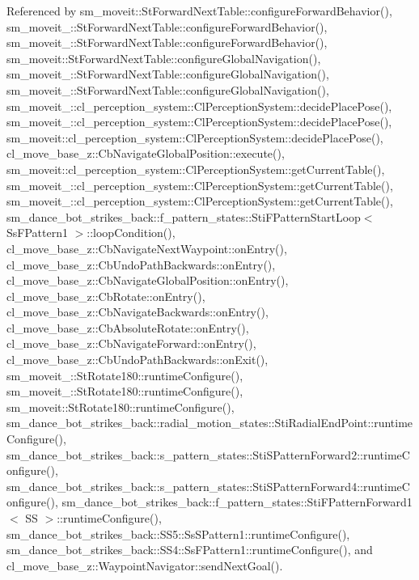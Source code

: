 Referenced by sm\+\_\+moveit\+::\+St\+Forward\+Next\+Table\+::configure\+Forward\+Behavior(), sm\+\_\+moveit\+\_\+::\+St\+Forward\+Next\+Table\+::configure\+Forward\+Behavior(), sm\+\_\+moveit\+\_\+::\+St\+Forward\+Next\+Table\+::configure\+Forward\+Behavior(), sm\+\_\+moveit\+::\+St\+Forward\+Next\+Table\+::configure\+Global\+Navigation(), sm\+\_\+moveit\+\_\+::\+St\+Forward\+Next\+Table\+::configure\+Global\+Navigation(), sm\+\_\+moveit\+\_\+::\+St\+Forward\+Next\+Table\+::configure\+Global\+Navigation(), sm\+\_\+moveit\+\_\+::cl\+\_\+perception\+\_\+system\+::\+Cl\+Perception\+System\+::decide\+Place\+Pose(), sm\+\_\+moveit\+\_\+::cl\+\_\+perception\+\_\+system\+::\+Cl\+Perception\+System\+::decide\+Place\+Pose(), sm\+\_\+moveit\+::cl\+\_\+perception\+\_\+system\+::\+Cl\+Perception\+System\+::decide\+Place\+Pose(), cl\+\_\+move\+\_\+base\+\_\+z\+::\+Cb\+Navigate\+Global\+Position\+::execute(), sm\+\_\+moveit\+::cl\+\_\+perception\+\_\+system\+::\+Cl\+Perception\+System\+::get\+Current\+Table(), sm\+\_\+moveit\+\_\+::cl\+\_\+perception\+\_\+system\+::\+Cl\+Perception\+System\+::get\+Current\+Table(), sm\+\_\+moveit\+\_\+::cl\+\_\+perception\+\_\+system\+::\+Cl\+Perception\+System\+::get\+Current\+Table(), sm\+\_\+dance\+\_\+bot\+\_\+strikes\+\_\+back\+::f\+\_\+pattern\+\_\+states\+::\+Sti\+F\+Pattern\+Start\+Loop$<$ Ss\+F\+Pattern1 $>$\+::loop\+Condition(), cl\+\_\+move\+\_\+base\+\_\+z\+::\+Cb\+Navigate\+Next\+Waypoint\+::on\+Entry(), cl\+\_\+move\+\_\+base\+\_\+z\+::\+Cb\+Undo\+Path\+Backwards\+::on\+Entry(), cl\+\_\+move\+\_\+base\+\_\+z\+::\+Cb\+Navigate\+Global\+Position\+::on\+Entry(), cl\+\_\+move\+\_\+base\+\_\+z\+::\+Cb\+Rotate\+::on\+Entry(), cl\+\_\+move\+\_\+base\+\_\+z\+::\+Cb\+Navigate\+Backwards\+::on\+Entry(), cl\+\_\+move\+\_\+base\+\_\+z\+::\+Cb\+Absolute\+Rotate\+::on\+Entry(), cl\+\_\+move\+\_\+base\+\_\+z\+::\+Cb\+Navigate\+Forward\+::on\+Entry(), cl\+\_\+move\+\_\+base\+\_\+z\+::\+Cb\+Undo\+Path\+Backwards\+::on\+Exit(), sm\+\_\+moveit\+\_\+::\+St\+Rotate180\+::runtime\+Configure(), sm\+\_\+moveit\+\_\+::\+St\+Rotate180\+::runtime\+Configure(), sm\+\_\+moveit\+::\+St\+Rotate180\+::runtime\+Configure(), sm\+\_\+dance\+\_\+bot\+\_\+strikes\+\_\+back\+::radial\+\_\+motion\+\_\+states\+::\+Sti\+Radial\+End\+Point\+::runtime\+Configure(), sm\+\_\+dance\+\_\+bot\+\_\+strikes\+\_\+back\+::s\+\_\+pattern\+\_\+states\+::\+Sti\+S\+Pattern\+Forward2\+::runtime\+Configure(), sm\+\_\+dance\+\_\+bot\+\_\+strikes\+\_\+back\+::s\+\_\+pattern\+\_\+states\+::\+Sti\+S\+Pattern\+Forward4\+::runtime\+Configure(), sm\+\_\+dance\+\_\+bot\+\_\+strikes\+\_\+back\+::f\+\_\+pattern\+\_\+states\+::\+Sti\+F\+Pattern\+Forward1$<$ S\+S $>$\+::runtime\+Configure(), sm\+\_\+dance\+\_\+bot\+\_\+strikes\+\_\+back\+::\+S\+S5\+::\+Ss\+S\+Pattern1\+::runtime\+Configure(), sm\+\_\+dance\+\_\+bot\+\_\+strikes\+\_\+back\+::\+S\+S4\+::\+Ss\+F\+Pattern1\+::runtime\+Configure(), and cl\+\_\+move\+\_\+base\+\_\+z\+::\+Waypoint\+Navigator\+::send\+Next\+Goal().


